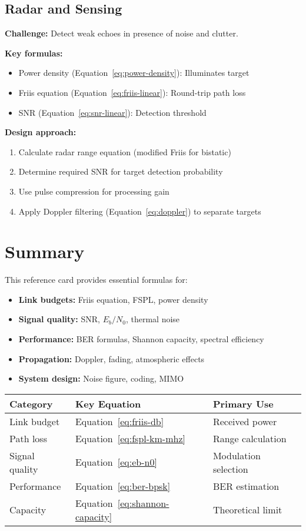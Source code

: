 \subsection{Radar and Sensing}

\textbf{Challenge:} Detect weak echoes in presence of noise and clutter.

\textbf{Key formulas:}
\begin{itemize}
\item Power density (Equation~\ref{eq:power-density}): Illuminates target
\item Friis equation (Equation~\ref{eq:friis-linear}): Round-trip path loss
\item SNR (Equation~\ref{eq:snr-linear}): Detection threshold
\end{itemize}

\textbf{Design approach:}
\begin{enumerate}
\item Calculate radar range equation (modified Friis for bistatic)
\item Determine required SNR for target detection probability
\item Use pulse compression for processing gain
\item Apply Doppler filtering (Equation~\ref{eq:doppler}) to separate targets
\end{enumerate}

\section{Summary}
\label{sec:summary}

This reference card provides essential formulas for:
\begin{itemize}
\item \textbf{Link budgets:} Friis equation, FSPL, power density
\item \textbf{Signal quality:} SNR, $E_b/N_0$, thermal noise
\item \textbf{Performance:} BER formulas, Shannon capacity, spectral efficiency
\item \textbf{Propagation:} Doppler, fading, atmospheric effects
\item \textbf{System design:} Noise figure, coding, MIMO
\end{itemize}

\begin{center}
\begin{tabular}{@{}lll@{}}
\toprule
\textbf{Category} & \textbf{Key Equation} & \textbf{Primary Use} \\
\midrule
Link budget & Equation~\ref{eq:friis-db} & Received power \\
Path loss & Equation~\ref{eq:fspl-km-mhz} & Range calculation \\
Signal quality & Equation~\ref{eq:eb-n0} & Modulation selection \\
Performance & Equation~\ref{eq:ber-bpsk} & BER estimation \\
Capacity & Equation~\ref{eq:shannon-capacity} & Theoretical limit \\
\bottomrule
\end{tabular}
\end{center}

